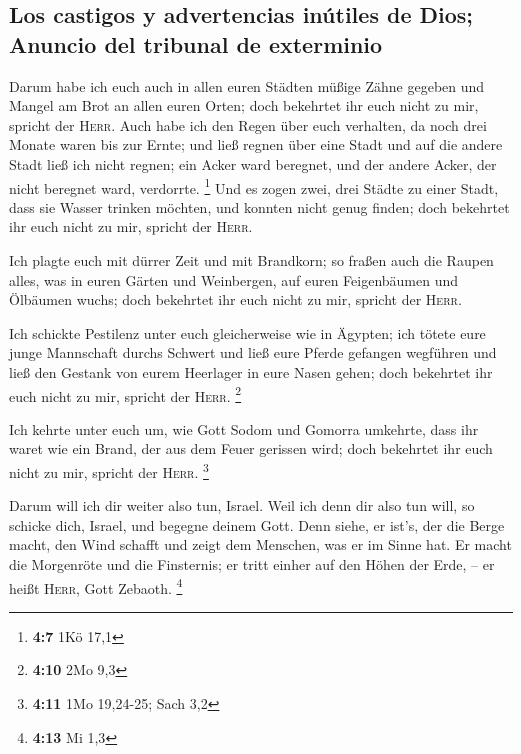\hypertarget{los-castigos-y-advertencias-inuxfatiles-de-dios-anuncio-del-tribunal-de-exterminio}{%
\subsection{Los castigos y advertencias inútiles de Dios; Anuncio del
tribunal de
exterminio}\label{los-castigos-y-advertencias-inuxfatiles-de-dios-anuncio-del-tribunal-de-exterminio}}

 Darum habe ich euch auch in allen euren Städten müßige
Zähne gegeben und Mangel am Brot an allen euren Orten; doch bekehrtet
ihr euch nicht zu mir, spricht der \textsc{Herr}.  Auch
habe ich den Regen über euch verhalten, da noch drei Monate waren bis
zur Ernte; und ließ regnen über eine Stadt und auf die andere Stadt ließ
ich nicht regnen; ein Acker ward beregnet, und der andere Acker, der
nicht beregnet ward, verdorrte. \footnote{\textbf{4:7} 1Kö 17,1}
 Und es zogen zwei, drei Städte zu einer Stadt, dass sie
Wasser trinken möchten, und konnten nicht genug finden; doch bekehrtet
ihr euch nicht zu mir, spricht der \textsc{Herr}.

 Ich plagte euch mit dürrer Zeit und mit Brandkorn; so
fraßen auch die Raupen alles, was in euren Gärten und Weinbergen, auf
euren Feigenbäumen und Ölbäumen wuchs; doch bekehrtet ihr euch nicht zu
mir, spricht der \textsc{Herr}.

 Ich schickte Pestilenz unter euch gleicherweise wie in
Ägypten; ich tötete eure junge Mannschaft durchs Schwert und ließ eure
Pferde gefangen wegführen und ließ den Gestank von eurem Heerlager in
eure Nasen gehen; doch bekehrtet ihr euch nicht zu mir, spricht der
\textsc{Herr}. \footnote{\textbf{4:10} 2Mo 9,3}

 Ich kehrte unter euch um, wie Gott Sodom und Gomorra
umkehrte, dass ihr waret wie ein Brand, der aus dem Feuer gerissen wird;
doch bekehrtet ihr euch nicht zu mir, spricht der \textsc{Herr}.
\footnote{\textbf{4:11} 1Mo 19,24-25; Sach 3,2}

 Darum will ich dir weiter also tun, Israel. Weil ich
denn dir also tun will, so schicke dich, Israel, und begegne deinem
Gott.  Denn siehe, er ist's, der die Berge macht, den
Wind schafft und zeigt dem Menschen, was er im Sinne hat. Er macht die
Morgenröte und die Finsternis; er tritt einher auf den Höhen der Erde,
-- er heißt \textsc{Herr}, Gott Zebaoth. \footnote{\textbf{4:13} Mi 1,3}

